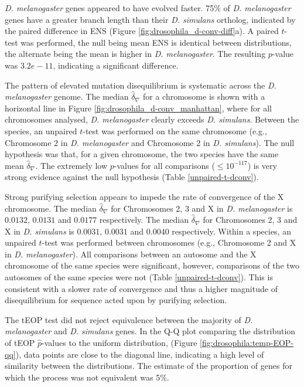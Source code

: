 \textit{D. melanogaster} genes appeared to have evolved faster. 75\% of \textit{D. melanogaster} genes have a greater \gls{branch length} than their \textit{D. simulans} ortholog, indicated by the paired difference in \acrshort{ENS} (Figure \ref{fig:drosophila_d-conv-diff}a). A paired $t$-test was performed, the null being mean ENS is identical between distributions, the alternate being the mean is higher in \textit{D. melanogaster}. The resulting $p$-value was $3.2e-11$, indicating a significant difference. 



The pattern of elevated mutation disequilibrium is systematic across the \textit{D. melanogaster} genome. The median $\hat \delta_\nabla$ for a chromosome is shown with a horizontal line in Figure \ref{fig:drosophila_d-conv_manhattan}, where for all chromosomes analysed, \textit{D. melanogaster} clearly exceeds \textit{D. simulans}. Between the species, an unpaired $t$-test was performed on the same chromosome (e.g., Chromosome 2 in \textit{D. melanogaster} and Chromosome 2 in \textit{D. simulans}). The null hypothesis was that, for a given chromosome, the two species have the same mean $\hat\delta_\nabla$. The extremely low $p$-values for all comparisons ($\leq10^{-117}$) is very strong evidence against the null hypothesis (Table \ref{unpaired-t-dconv}).

Strong purifying selection appears to impede the rate of convergence of the X chromosome. The median $\hat \delta_\nabla$ for Chromosomes 2, 3 and X in \textit{D. melanogaster} is $0.0132$, $0.0131$ and $0.0177$ respectively. The median $\hat \delta_\nabla$ for Chromosomes 2, 3 and X in \textit{D. simulans} is $0.0031$, $0.0031$ and $0.0040$ respectively. Within a species, an unpaired $t$-test was performed between chromosomes (e.g., Chromosome 2 and X in \textit{D. melanogaster}). All comparisons between an autosome and the X chromosome of the same species were significant, however, comparisons of the two autosomes of the same species were not (Table \ref{unpaired-t-dconv}). This is consistent with a slower rate of convergence and thus a higher magnitude of disequilibrium for sequence acted upon by purifying selection. 





The \acrshort{tEOP} test did not reject equivalence between the majority of \textit{D. melanogaster} and \textit{D. simulans} genes. In the Q-Q plot comparing the distribution of tEOP $\hat p$-values to the uniform distribution, (Figure \ref{fig:drosophila:temp-EOP-qq}), data points are close to the diagonal line, indicating a high level of similarity between the distributions. The estimate of the proportion of genes for which the process was not equivalent was 5\%.


